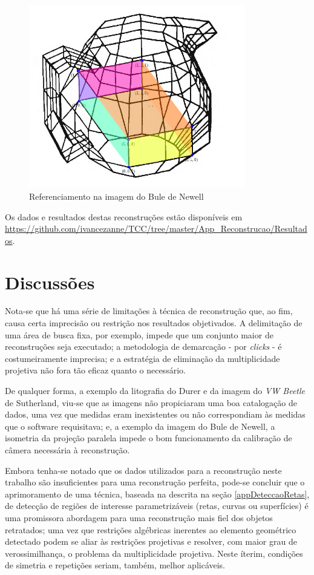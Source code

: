 			\begin{figure}[!htb]
				\centering
				\includegraphics[height=8cm]{imagens/printBuleDispensada.png}
				\caption{Referenciamento na imagem do Bule de Newell}
				\label{imagemBuleDispensada}
			\end{figure}
			
			Os dados e resultados destas reconstruções estão disponíveis em \url{https://github.com/ivancezanne/TCC/tree/master/App_Reconstrucao/Resultados}.
			
		\section{Discussões}
			\label{secaoDiscussoes}
			
			Nota-se que há uma série de limitações à técnica de reconstrução que, ao fim, causa certa imprecisão ou restrição nos resultados objetivados. A delimitação de uma área de busca fixa, por exemplo, impede que um conjunto maior de reconstruções seja executado; a metodologia de demarcação - por \textit{clicks} - é costumeiramente imprecisa; e a estratégia de eliminação da multiplicidade projetiva não fora tão eficaz quanto o necessário.
			
			De qualquer forma, a exemplo da litografia do Durer e da imagem do \textit{VW Beetle} de Sutherland, viu-se que as imagens não propiciaram uma boa catalogação de dados, uma vez que medidas eram inexistentes ou não correspondiam às medidas que o software requisitava; e, a exemplo da imagem do Bule de Newell, a isometria da projeção paralela impede o bom funcionamento da calibração de câmera necessária à reconstrução.
			
			Embora tenha-se notado que os dados utilizados para a reconstrução neste trabalho são insuficientes para uma reconstrução perfeita, pode-se concluir que o aprimoramento de uma técnica, baseada na descrita na seção \ref{appDeteccaoRetas}, de detecção de regiões de interesse parametrizáveis (retas, curvas ou superfícies) é uma promissora abordagem para uma reconstrução mais fiel dos objetos retratados; uma vez que restrições algébricas inerentes ao elemento geométrico detectado podem se aliar às restrições projetivas e resolver, com maior grau de verossimilhança, o problema da multiplicidade projetiva. Neste íterim, condições de simetria e repetições seriam, também, melhor aplicáveis.
			
